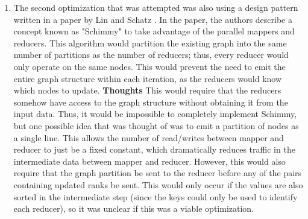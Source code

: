 \begin{enumerate}
\item The second optimization that was attempted was also using a design pattern
written in a paper by Lin and Schatz \cite{lin2010design}. In the paper, the authors
describe a concept known as "Schimmy" to take advantage of the parallel mappers and reducers. 
This algorithm would partition the existing graph into the same number of partitions 
as the number of reducers; thus, every reducer would only operate on the same nodes. 
This would prevent the need to emit the entire graph structure within each iteration,
as the reducers would know which nodes to update.
    \subitem \textbf{Thoughts} This would require that the reducers somehow have
    access to the graph structure without obtaining it from the input data. Thus, 
    it would be impossible to completely implement Schimmy, but one possible idea 
    that was thought of was to emit a partition of nodes as a single line. This 
    allows the number of read/writes between mapper and reducer to just be a fixed
    constant, which dramatically reduces traffic in the intermediate data between
    mapper and reducer. However, this would also require that the graph
    partition be sent to the reducer before any of the pairs containing updated ranks
    be sent. This would only occur if the values are also sorted in the intermediate step
    (since the keys could only be used to identify each reducer), so it
    was unclear if this was a viable optimization.
\end{enumerate}

\printbibilography





